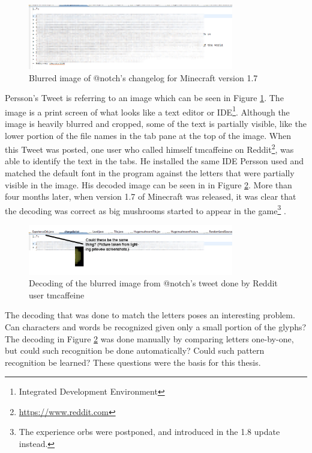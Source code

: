 \newpage
\begin{figure}[h]
    \centering
    \includegraphics[width=0.8\textwidth]{fig/chapter1/notch_eclipse.jpg}
    \caption{Blurred image of @notch's changelog for Minecraft version 1.7}
    \label{fig:notch_imgur}
\end{figure}

Persson's Tweet is referring to an image which can be seen in Figure \ref{fig:notch_imgur}. The image is a print screen of what looks like a text editor or IDE\footnote{Integrated Development Environment}. Although the image is heavily blurred and cropped, some of the text is partially visible, like the lower portion of the file names in the tab pane at the top of the image. When this Tweet was posted, one user who called himself tmcaffeine on Reddit\footnote{\url{https://www.reddit.com}}, was able to identify the text in the tabs. He installed the same IDE Persson used and matched the default font in the program against the letters that were partially visible in the image. His decoded image can be seen in in Figure \ref{fig:notch_eclipse_decoded}. More than four months later, when version 1.7 of Minecraft was released, it was clear that the decoding was correct as big mushrooms started to appear in the game\footnote{The experience orbs were postponed, and introduced in the 1.8 update instead.} \citep{misc-minecraft.172-changelog}.

\begin{figure}[ht]
    \centering
    \captionsetup{justification=centering}
    \includegraphics[width=0.8\textwidth]{fig/chapter1/notch_eclipse_decoded.jpg}
    \caption{Decoding of the blurred image from @notch's tweet done by Reddit user tmcaffeine}
    \label{fig:notch_eclipse_decoded}
\end{figure}

The decoding that was done to match the letters poses an interesting problem. Can characters and words be recognized given only a small portion of the glyphs? The decoding in Figure \ref{fig:notch_eclipse_decoded} was done manually by comparing letters one-by-one, but could such recognition be done automatically? Could such pattern recognition be learned? These questions were the basis for this thesis.

